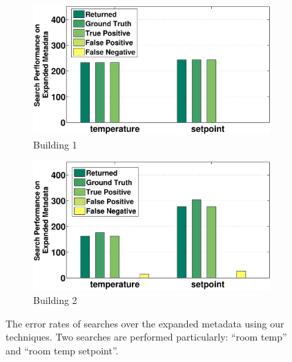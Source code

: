 
\begin{figure}[ht!]
\centering
	\begin{subfigure}{0.48\textwidth}
                \centering
		\includegraphics[width=\textwidth]{./figs/50-soda.eps}
                \caption{Building 1}
	\end{subfigure}
	\begin{subfigure}{0.48\textwidth}
                \centering
		\includegraphics[width=\textwidth]{./figs/50-sdh.eps}
                \caption{Building 2}
	\end{subfigure}
\caption{The error rates of searches over the expanded metadata using our techniques. Two searches are performed particularly: ``room temp'' and ``room temp setpoint''.}
\label{fig:error}
\end{figure}

